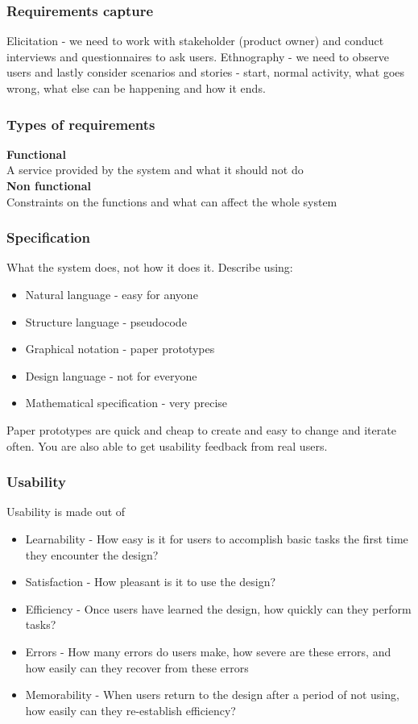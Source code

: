 \documentclass[a4paper]{article}
\theoremstyle{plain}
\theoremstyle{definition}
\theoremstyle{remark}
\begin{document}
\begin{flushleft}
\subsubsection{Requirements capture}
Elicitation - we need to work with stakeholder (product owner) and conduct interviews and questionnaires to ask users. Ethnography - we need to observe users and lastly consider scenarios and stories - start, normal activity, what goes wrong, what else can be happening and how it ends. 
\subsubsection{Types of requirements}
\textbf{Functional}\\
A service provided by the system and what it should not do\\
\textbf{Non functional}\\
Constraints on the functions and what can affect the whole system
\subsubsection{Specification}
What the system does, not how it does it. Describe using:
\begin{itemize}
	\item Natural language - easy for anyone
	\item Structure language - pseudocode
	\item Graphical notation - paper prototypes
	\item Design language - not for everyone
	\item Mathematical specification - very precise
\end{itemize}
Paper prototypes are quick and cheap to create and easy to change and iterate often. You are also able to get usability feedback from real users. 
\subsubsection{Usability}
Usability is made out of
\begin{itemize}
	\item Learnability - How easy is it for users to accomplish basic tasks the first time they encounter the design?
	\item Satisfaction - How pleasant is it to use the design?
	\item Efficiency - Once users have learned the design, how quickly can they perform tasks?
	\item Errors - How many errors do users make, how severe are these errors, and how easily can they recover from these errors
	\item Memorability - When users return to the design after a period of not using, how easily can they re-establish efficiency?
\end{itemize}

\end{flushleft}
\end{document}
